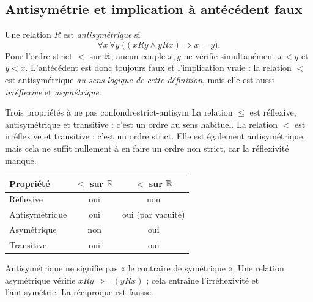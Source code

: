 \subsection{Antisymétrie et implication à antécédent faux}
Une relation $R$ est \emph{antisymétrique} si
\[
 \forall x\,\forall y\;\bigl((xRy\wedge yRx)\Longrightarrow x=y\bigr).
\]
Pour l'ordre strict $<$ sur $\mathbb R$, aucun couple $x,y$ ne vérifie simultanément
$x<y$ et $y<x$. L'antécédent est donc toujours faux et l'implication vraie :
la relation $<$ est antisymétrique \emph{au sens logique de cette définition},
mais elle est aussi \emph{irréflexive} et \emph{asymétrique}.
\begin{exemple}{Trois propriétés à ne pas confondre}{strict-antisym}
La relation $\le$ est réflexive, antisymétrique et transitive : c'est un ordre
au sens habituel. La relation $<$ est irréflexive et transitive : c'est un ordre
strict. Elle est également antisymétrique, mais cela ne suffit nullement à en faire
un ordre non strict, car la réflexivité manque.
\end{exemple}
\begin{center}\renewcommand{\arraystretch}{1.2}
\begin{tabular}{lcc}\toprule
Propriété & $\le$ sur $\mathbb R$ & $<$ sur $\mathbb R$\\\midrule
Réflexive & oui & non\\
Antisymétrique & oui & oui (par vacuité)\\
Asymétrique & non & oui\\
Transitive & oui & oui\\\bottomrule
\end{tabular}\end{center}
\begin{attention}
Antisymétrique ne signifie pas « le contraire de symétrique ».
Une relation asymétrique vérifie $xRy\Rightarrow\neg(yRx)$ ; cela entraîne
l'irréflexivité et l'antisymétrie. La réciproque est fausse.
\end{attention}


